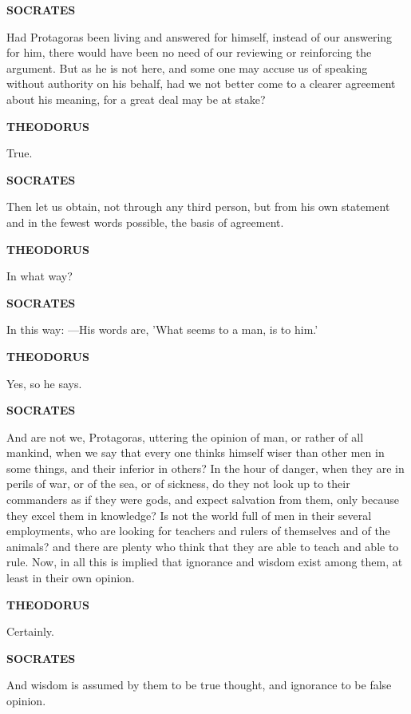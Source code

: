 \documentclass[11pt,letter]{article}
\begin{document}
\par \textbf{SOCRATES}
\par   Had Protagoras been living and answered for himself, instead of our answering for him, there would have been no need of our reviewing or reinforcing the argument. But as he is not here, and some one may accuse us of speaking without authority on his behalf, had we not better come to a clearer agreement about his meaning, for a great deal may be at stake?

\par \textbf{THEODORUS}
\par   True.

\par \textbf{SOCRATES}
\par   Then let us obtain, not through any third person, but from his own statement and in the fewest words possible, the basis of agreement.

\par \textbf{THEODORUS}
\par   In what way?

\par \textbf{SOCRATES}
\par   In this way: —His words are, 'What seems to a man, is to him.'

\par \textbf{THEODORUS}
\par   Yes, so he says.

\par \textbf{SOCRATES}
\par   And are not we, Protagoras, uttering the opinion of man, or rather of all mankind, when we say that every one thinks himself wiser than other men in some things, and their inferior in others? In the hour of danger, when they are in perils of war, or of the sea, or of sickness, do they not look up to their commanders as if they were gods, and expect salvation from them, only because they excel them in knowledge? Is not the world full of men in their several employments, who are looking for teachers and rulers of themselves and of the animals? and there are plenty who think that they are able to teach and able to rule. Now, in all this is implied that ignorance and wisdom exist among them, at least in their own opinion.

\par \textbf{THEODORUS}
\par   Certainly.

\par \textbf{SOCRATES}
\par   And wisdom is assumed by them to be true thought, and ignorance to be false opinion.
\end{document}
